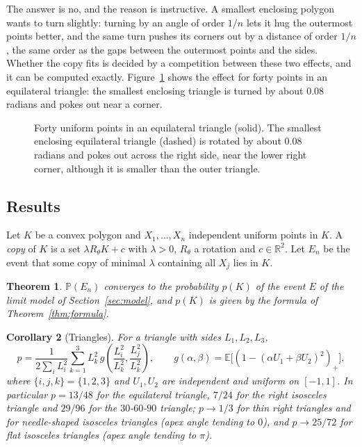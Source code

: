\documentclass[11pt]{amsart}
\newtheorem{theorem}{Theorem}
\newtheorem{corollary}[theorem]{Corollary}
\theoremstyle{remark}\newtheorem{remark}[theorem]{Remark}
\newcommand{\R}{\mathbb{R}}
\newcommand{\Prob}{\mathbb{P}}
\newcommand{\E}{\mathbb{E}}
\begin{document}
The answer is no, and the reason is instructive. A smallest enclosing polygon wants to turn slightly: turning by an
angle of order $1/n$ lets it hug the outermost points better, and the same turn pushes its corners out by a distance
of order $1/n$, the same order as the gaps between the outermost points and the sides. Whether the copy fits is
decided by a competition between these two effects, and it can be computed exactly. Figure~\ref{fig:example} shows the effect for forty points in an equilateral triangle: the smallest enclosing triangle is turned by about $0.08$ radians and pokes out near a corner.

\begin{figure}[ht]
\centering

\caption{Forty uniform points in an equilateral triangle (solid). The smallest enclosing equilateral triangle
(dashed) is rotated by about $0.08$ radians and pokes out across the right side, near the lower right corner, although it is smaller than the
outer triangle.}
\label{fig:example}
\end{figure}

\subsection*{Results}
Let $K$ be a convex polygon and $X_1,\dots,X_n$ independent uniform points in $K$. A \emph{copy} of $K$ is a set
$\lambda R_\theta K+c$ with $\lambda>0$, $R_\theta$ a rotation and $c\in\R^2$. Let $E_n$ be the event that some copy of
minimal $\lambda$ containing all $X_j$ lies in $K$.

\begin{theorem}\label{thm:main}
$\Prob(E_n)$ converges to the probability $p(K)$ of the event $E$ of the limit model of Section~\ref{sec:model}, and
$p(K)$ is given by the formula of Theorem~\ref{thm:formula}.
\end{theorem}

\begin{corollary}[Triangles]\label{cor:tri}
For a triangle with sides $L_1,L_2,L_3$,
\[
p=\frac{1}{2\sum_i L_i^2}\sum_{k=1}^{3}L_k^2\,g\!\left(\frac{L_i^2}{L_k^2},\frac{L_j^2}{L_k^2}\right),\qquad
g(\alpha,\beta)=\E\big[(1-(\alpha U_1+\beta U_2)^2)_+\big],
\]
where $\{i,j,k\}=\{1,2,3\}$ and $U_1,U_2$ are independent and uniform on $[-1,1]$. In particular $p=13/48$ for the
equilateral triangle, $7/24$ for the right isosceles triangle and $29/96$ for the $30$-$60$-$90$ triangle;
$p\to 1/3$ for thin right triangles and for needle-shaped isosceles triangles (apex angle tending to $0$), and
$p\to25/72$ for flat isosceles triangles (apex angle tending to $\pi$).
\end{corollary}
\end{document}
